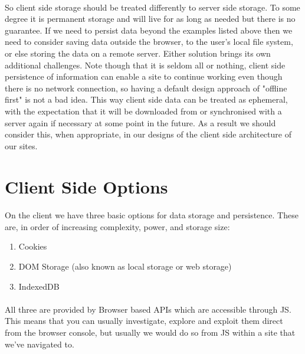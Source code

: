 \paragraph{} So client side storage should be treated differently to server side storage. To some degree it is permanent storage and will live for as long as needed but there is no guarantee. If we need to persist data beyond the examples listed above then we need to consider saving data outside the browser, to the user’s local file system, or else storing the data on a remote server. Either solution brings its own additional challenges. Note though that it is seldom all or nothing, client side persistence of information can enable a site to continue working even though there is no network connection, so having a default design approach of "offline first" is not a bad idea. This way client side data can be treated as ephemeral, with the expectation that it will be downloaded from or synchronised with a server again if necessary at some point in the future. As a result we should consider this, when appropriate, in our designs of the client side architecture of our sites.


\section{Client Side Options}
\paragraph{} On the client we have three basic options for data storage and persistence. These are, in order of increasing complexity, power, and storage size:

\begin{enumerate}
\item Cookies
\item DOM Storage (also known as local storage or web storage)
\item IndexedDB
\end{enumerate}

\paragraph{} All three are provided by Browser based APIs which are accessible through JS. This means that you can usually investigate, explore and exploit them direct from the browser console, but usually we would do so from JS within a site that we’ve navigated to.

